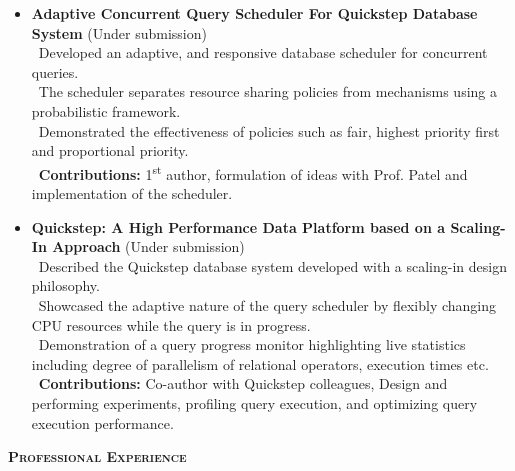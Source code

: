 \documentclass[11pt]{article}
\newcommand{\graybox}[1]{\begin{mdframed}[backgroundcolor=light-gray, linecolor=light-gray, roundcorner=10pt, shadow=false, shadowsize=1pt]
\Large{\textbf{\textsc{#1}}}
\end{mdframed}}
\begin{document}
\begin{itemize}\addtolength{\itemsep}{-0.5\baselineskip}
\item{\textbf{Adaptive Concurrent Query Scheduler For Quickstep Database System} (Under submission)}\\
		\textendash\ Developed an adaptive, and responsive database scheduler for concurrent queries.\\
		\textendash\ The scheduler separates resource sharing policies from mechanisms using a probabilistic framework. \\
		\textendash\ Demonstrated the effectiveness of policies such as fair, highest priority first and proportional priority.\\
		\textendash\ \textbf{Contributions:} 1\textsuperscript{st} author, formulation of ideas with Prof. Patel and implementation of the scheduler.\\
\item{\textbf{Quickstep: A High Performance Data Platform based
on a Scaling-In Approach} (Under submission)}	\\
		\textendash\ Described the Quickstep database system developed with a scaling-in design philosophy.\\
		\textendash\ Showcased the adaptive nature of the query scheduler by flexibly changing CPU resources while the query is in progress. \\
		\textendash\ Demonstration of a query progress monitor highlighting live statistics including degree of parallelism of relational operators, execution times etc.\\
		\textendash\ \textbf{Contributions:} Co-author with Quickstep colleagues, Design and performing experiments, profiling query execution, and optimizing query execution performance.
\end{itemize}
\graybox{Professional Experience}
\end{document}
